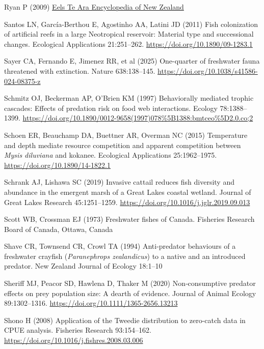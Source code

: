 \documentclass[
  12pt,
  a4paper,
  oneside]{scrbook}
\newlength{\cslhangindent}
\newenvironment{CSLReferences}[2] %
 {\begin{list}{}{%
  \setlength{\itemindent}{0pt}
  \setlength{\leftmargin}{0pt}
  \setlength{\parsep}{0pt}
  \ifodd #1
   \setlength{\leftmargin}{\cslhangindent}
   \setlength{\itemindent}{-1\cslhangindent}
  \fi
  \setlength{\itemsep}{#2\baselineskip}}}
 {\end{list}}
\begin{document}
\begin{CSLReferences}{1}{1}
Ryan P (2009) \href{https://teara.govt.nz/en/eels}{Eels \textbar{} {Te
Ara Encyclopedia of New Zealand}}

Santos LN, García-Berthou E, Agostinho AA, Latini JD (2011) Fish
colonization of artificial reefs in a large {Neotropical} reservoir:
Material type and successional changes. Ecological Applications
21:251--262. \url{https://doi.org/10.1890/09-1283.1}

Sayer CA, Fernando E, Jimenez RR, et al (2025) One-quarter of freshwater
fauna threatened with extinction. Nature 638:138--145.
\url{https://doi.org/10.1038/s41586-024-08375-z}

Schmitz OJ, Beckerman AP, O'Brien KM (1997) Behaviorally mediated
trophic cascades: Effects of predation risk on food web interactions.
Ecology 78:1388--1399.
\url{https://doi.org/10.1890/0012-9658(1997)078\%5B1388:bmtceo\%5D2.0.co;2}

Schoen ER, Beauchamp DA, Buettner AR, Overman NC (2015) Temperature and
depth mediate resource competition and apparent competition between
{\emph{Mysis diluviana}} and kokanee. Ecological Applications
25:1962--1975. \url{https://doi.org/10.1890/14-1822.1}

Schrank AJ, Lishawa SC (2019) Invasive cattail reduces fish diversity
and abundance in the emergent marsh of a {Great Lakes} coastal wetland.
Journal of Great Lakes Research 45:1251--1259.
\url{https://doi.org/10.1016/j.jglr.2019.09.013}

Scott WB, Crossman EJ (1973) Freshwater fishes of {Canada}. Fisheries
Research Board of Canada, Ottawa, Canada

Shave CR, Townsend CR, Crowl TA (1994) Anti-predator behaviours of a
freshwater crayfish ({\emph{Paranephrops zealandicus}}) to a native and
an introduced predator. New Zealand Journal of Ecology 18:1--10

Sheriff MJ, Peacor SD, Hawlena D, Thaker M (2020) Non‐consumptive
predator effects on prey population size: A dearth of evidence. Journal
of Animal Ecology 89:1302--1316.
\url{https://doi.org/10.1111/1365-2656.13213}

Shono H (2008) Application of the {Tweedie} distribution to zero-catch
data in {CPUE} analysis. Fisheries Research 93:154--162.
\url{https://doi.org/10.1016/j.fishres.2008.03.006}


\end{CSLReferences}
\end{document}
